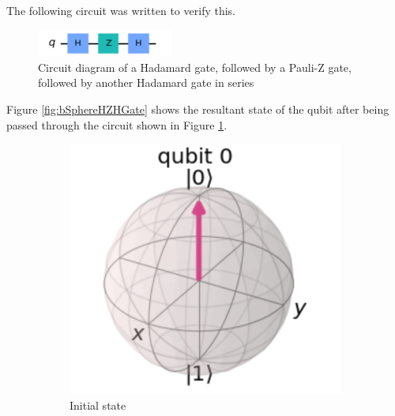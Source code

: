 The following circuit was written to verify this.

\begin{figure}[h]
    \centering
    \includegraphics[width=0.4\textwidth]{lab2/images/hzhCircuit.png}
    \caption{Circuit diagram of a Hadamard gate, followed by a Pauli-Z gate, followed by another Hadamard gate in series} 
    \label{fig:hzhCircuit}
\end{figure}

Figure \ref{fig:bSphereHZHGate} shows the resultant state of the qubit after being passed through the circuit shown in Figure \ref{fig:hzhCircuit}.

\begin{figure}[h]
    \centering
    \begin{subfigure}[h]{0.24\textwidth}
        \centering
        \includegraphics[width=\textwidth]{lab2/images/hzhGate1.png}
        \caption{Initial state}
        \label{fig:hzhGate1}
    \end{subfigure}
    \hfill
    \begin{subfigure}[h]{0.24\textwidth}
        \centering

\end{subfigure}
\end{figure}
